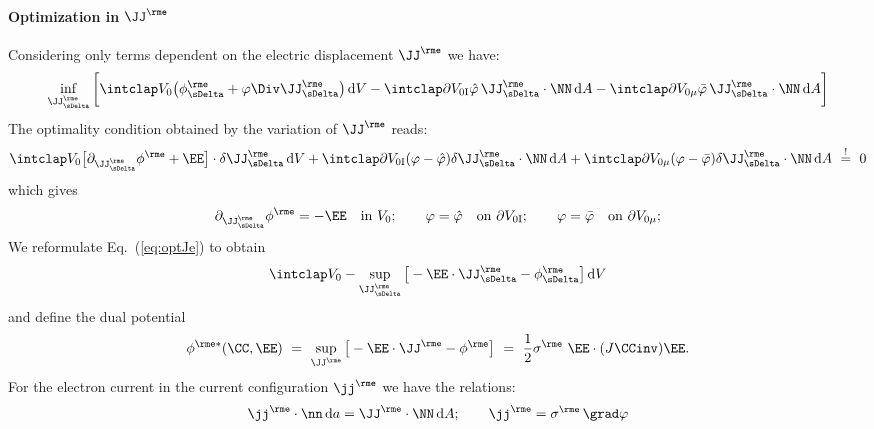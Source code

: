 \paragraph{Optimization in $\JJe$} \label{sec:optJe} %
  Considering only terms dependent on the electric displacement $\JJe$ we have:
  \begin{align}
    \inf_{\JJeDelta} \bigg[ \intVO \big( \phieDelta + \varphi \Div\JJeDelta \big) \dV 
    - \intdVOx{I} \hat\varphi \, \JJeDelta\cdot\NN \dA 
    - \intdVOx{\mu} \bar\varphi \, \JJeDelta\cdot\NN \dA \bigg]
    \label{eq:optJe}
  \end{align}
  The optimality condition obtained by the variation of $\JJe$ reads:
  \begin{align}
    \intVO \big[\dJJe\phie+\EE\big]\cdot\delta\JJeDelta \dV + \intdVOx{I} (\varphi-\hat\varphi) \delta\JJeDelta\cdot\NN\dA + \intdVOx{\mu} (\varphi-\bar\varphi)\delta\JJeDelta\cdot\NN\dA  \ \stackrel{!}{=} \ 0  
  \end{align}
  which gives
  \begin{align}
    \dJJe\phie = -\EE \quad \text{in} \ V_0; \qquad \varphi=\hat\varphi \quad \text{on} \ \partial V_{0\rm I}; \qquad \varphi=\bar\varphi \quad \text{on} \ \partial V_{0\mu};
  \end{align}
  We reformulate Eq.~(\ref{eq:optJe}) to obtain
  \begin{align}
    \intVO -\sup_{\JJeDelta} \big[ -\EE\cdot\JJeDelta - \phieDelta \big]\dV
  \end{align}
  and define the dual potential
  \begin{align}
    \phies(\CC,\EE) \ = \ \sup_{\JJe} \big[ -\EE\cdot\JJe - \phie \big] \ = \ \frac{1}{2} \sigmae \ \EE \cdot (J\CCinv)\EE.
  \end{align}
  For the electron current in the current configuration $\jje$ we have the relations:
  \begin{align}
    \jje\cdot\nn\,\rmd a = \JJe\cdot\NN\dA; \qquad \jje = \sigmae\,\grad\varphi
  \end{align}


